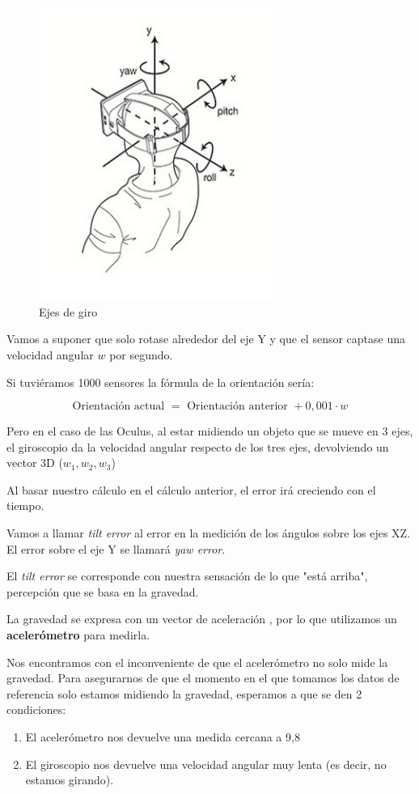 \documentclass[twoside, 12pt]{epstfg}
\begin{document}
\begin{figure}[h]
	\centerline{
		\mbox{\includegraphics[width=3.00in]{images/headtracking.png}}
	}
	\caption{Ejes de giro}
\end{figure}

Vamos a suponer que solo rotase alrededor del eje Y y que el sensor captase una velocidad angular $w$ por segundo.

Si tuviéramos 1000 sensores la fórmula de la orientación sería:

$$\text{Orientación actual } = \text{ Orientación anterior } + 0,001 \cdot w$$

Pero en el caso de las Oculus, al estar midiendo un objeto que se mueve en 3 ejes, el giroscopio da la velocidad angular respecto de los tres ejes, devolviendo un vector 3D ($w_1,w_2,w_3$)

Al basar nuestro cálculo en el cálculo anterior, el error irá creciendo con el tiempo.

Vamos a llamar \textit{tilt error} al error en la medición de los ángulos sobre los ejes XZ. El error sobre el eje Y se llamará \textit{yaw error}.

El \textit{tilt error} se corresponde con nuestra sensación de lo que "está arriba", percepción que se basa en la gravedad.

La gravedad se expresa con un vector de aceleración , por lo que utilizamos un \textbf{acelerómetro} para medirla.

Nos encontramos con el inconveniente de que el acelerómetro no solo mide la gravedad. Para asegurarnos de que el momento en el que tomamos los datos de referencia solo estamos midiendo la gravedad, esperamos a que se den 2 condiciones:
\begin{enumerate}
	\item El acelerómetro nos devuelve una medida cercana a 9,8
	\item El giroscopio nos devuelve una velocidad angular muy lenta (es decir, no estamos girando).
\end{enumerate}
\end{document}
